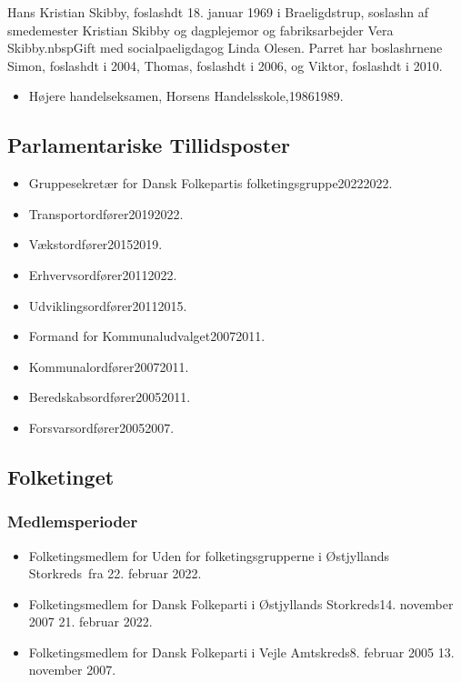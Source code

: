 \documentclass[11pt, a4paper]{awesome-cv}
\begin{document}
\makecvheader[R]
\makelettertitle
\begin{cvletter}
Hans Kristian Skibby, foslashdt 18. januar 1969 i Braeligdstrup, soslashn af smedemester Kristian Skibby og dagplejemor og fabriksarbejder Vera Skibby.nbspGift med socialpaeligdagog Linda Olesen. Parret har boslashrnene Simon, foslashdt i 2004, Thomas, foslashdt i 2006, og Viktor, foslashdt i 2010.

\begin{itemize}
\item Højere handelseksamen, Horsens Handelsskole,19861989.
\end{itemize}
\subsection*{Parlamentariske Tillidsposter}
\begin{itemize}
\item Gruppesekretær for Dansk Folkepartis folketingsgruppe20222022.
\item Transportordfører20192022.
\item Vækstordfører20152019.
\item Erhvervsordfører20112022.
\item Udviklingsordfører20112015.
\item Formand for Kommunaludvalget20072011.
\item Kommunalordfører20072011.
\item Beredskabsordfører20052011.
\item Forsvarsordfører20052007.
\end{itemize}
\subsection*{Folketinget}
\subsubsection*{Medlemsperioder}
\begin{itemize}
\item Folketingsmedlem for Uden for folketingsgrupperne i Østjyllands Storkreds fra 22. februar 2022.
\item Folketingsmedlem for Dansk Folkeparti i Østjyllands Storkreds14. november 2007  21. februar 2022.
\item Folketingsmedlem for Dansk Folkeparti i Vejle Amtskreds8. februar 2005  13. november 2007.
\end{itemize}

\end{cvletter}
\end{document}
